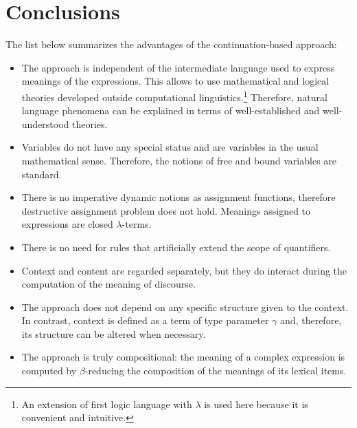\section{Conclusions} \label{sec:conclusions}


The list below summarizes the advantages of the continuation-based approach:

\begin{itemize}

\item The approach is independent of the intermediate language used to express meanings of the expressions. This allows to use mathematical and logical theories developed outside computational linguistics.\footnote{An extension of first logic language with $\lambda$ is used here because it is convenient and intuitive.} Therefore, natural language phenomena can be explained in terms of well-established and well-understood theories.

\item Variables do not have any special status and are variables in the usual mathematical sense. Therefore, the notions of free and bound variables are standard.  

\item There is no imperative dynamic notions as assignment functions, therefore destructive assignment problem does not hold. Meanings assigned to expressions are closed $\lambda$-terms. 

\item There is no need for rules that artificially extend the scope of quantifiers.

\item Context and content are regarded separately, but they do interact during the computation of the meaning of discourse.  

\item The approach does not depend on any specific structure given to the context. In contrast, context is defined as a term of type parameter $\gamma$ and, therefore, its structure can be altered when necessary.

\item The approach is truly compositional: the meaning of a complex expression is computed by $\beta$-reducing the composition of the meanings of its lexical items.

\end{itemize}
